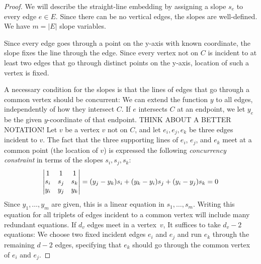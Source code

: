 \begin{proof}
  We will describe the straight-line embedding by assigning a slope $s_e$
to every edge $e\in E$.
Since there can be no vertical edges, the slopes are well-defined.
We have $m=|E|$ slope variables.

Since every edge goes through a point on the y-axis with known
coordinate, the slope fixes the line through the edge.
 Since
every vertex not on $C$ is incident to at least two edges that go
through
distinct points on the y-axis, location of such a vertex is fixed.

A necessary condition for the slopes is that the lines of edges that
go through a common vertex should be concurrent:
We can extend the function $y$ to all edges, independently of how they
intersect $C$. If $e$ intersects $C$ at an endpoint, we let $y_e$ be
the
given $y$-coordinate of that endpoint. THINK ABOUT A BETTER NOTATION!
%
Let $v$ be a vertex $v$ not on $C$, and let $e_i, e_j, e_k$ be three
edges incident to $v$.
The fact that the three supporting lines of $e_i$, $e_j$, and $e_k$ 
meet at a common point (the location of $v$) is expressed
the following \emph{concurrency constraint} 
in terms of the slopes $s_i,s_j,s_k$:
\begin{equation}\eqlabel{slope0} 
\left|
  \begin{matrix}
    1&1&1\\
s_i&s_j&s_k\\
y_i&y_j&y_k
  \end{matrix}
\right|=
   ({y_j-y_k}) s_i + ({y_k-y_i}) s_j 
          + ({y_i-y_j})s_k  = 0
\end{equation}
Since $y_1,\ldots,y_m$ are given, this is a linear equation
in $s_1,\ldots,s_m$.
Writing this equation for all triplets of edges incident to a common
vertex will include many redundant equations.
If $d_v$ edges meet in a vertex~$v$, 
 It suffices to take $d_v-2$ equations: We choose two fixed
incident edges $e_i$ and $e_j$ and run $e_k$ through the remaining
$d-2$ edges, specifying that $e_k$ should go through the common vertex
of $e_i$ and $e_j$.


\end{proof}
